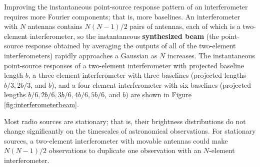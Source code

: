 \documentclass[a4paper,10pt]{article}
\begin{document}
{\noindent}Improving the instantaneous point-source response pattern of an interferometer requires more Fourier components; that is, more baselines. An interferometer with $N$ antennas contains $N(N-1)/2$ pairs of antennas, each of which is a two-element interferometer, so the instantaneous \textbf{synthesized beam} (the point-source response obtained by averaging the outputs of all of the two-element interferometers) rapidly approaches a Gaussian as $N$ increases. The instantaneous point-source responses of a two-element interferometer with projected baseline length $b$, a three-element interferometer with three baselines (projected lengths $b/3,2b/3$, and $b$), and a four-element interferometer with six baselines (projected lengths $b/6,2b/6,3b/6,4b/6,5b/6$, and $b$) are shown in Figure \ref{fig:interferometerbeam}.

{\noindent}Most radio sources are stationary; that is, their brightness distributions do not change significantly on the timescales of astronomical observations. For stationary sources, a two-element interferometer with movable antennas could make $N(N-1)/2$ observations to duplicate one observation with an $N$-element interferometer.
\end{document}
